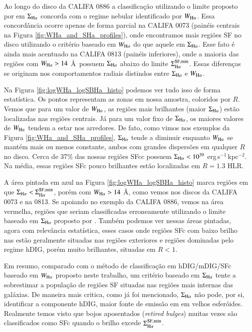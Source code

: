 Ao longo do disco da CALIFA 0886 a classificação utilizando o limite proposto por \citet{Zhang.etal.2017a} em $\Sigma_{\Ha}$ concorda com o regime nebular identificado por $W_{\Ha}$. Essa concordância ocorre apenas de forma parcial na CALIFA 0073 (painéis centrais na Figura \ref{fig:WHa_and_SHa_profiles}), onde encontramos mais regiões SF no disco utilizando o critério baseado em $W_{\Ha}$ do que aquele em $\Sigma_{\Ha}$. Esse fato é ainda mais acentuado na CALIFA 0813 (painéis inferiores), onde a maioria das regiões com $W_{\Ha} > 14$ \AA\ possuem $\Sigma_{\Ha}$ abaixo do limite $\Sigma^{\rm SF,min}_{\Ha}$. Essas diferenças se originam nos comportamentos radiais distindos entre $\Sigma_{\Ha}$ e $W_{\Ha}$.

Na Figura \ref{fig:logWHa_logSBHa_histo} podemos ver tudo isso de forma estatística. Os pontos representam as zonas em nossa amostra, coloridos por $R$. Vemos que para um valor de $W_{\Ha}$, as regiões mais brilhantes (maior $\Sigma_{\Ha}$) estão localizadas nas regiões centrais. Já para um valor fixo de $\Sigma_{\Ha}$, os maiores valores de $W_{\Ha}$ tendem a estar nos arredores. De fato, como vimos nos exemplos da Figura \ref{fig:WHa_and_SHa_profiles}, $\Sigma_{\Ha}$ tende a diminuir enquanto $W_{\Ha}$ se mantém mais ou menos constante, ambos com grandes dispersões em qualquer $R$ no disco. Cerca de 37\% das nossas regiões SFcc possuem $\Sigma_{\Ha} < 10^{39}$ erg$\,$s$^{-1}\,$kpc$^{-2}$. Na média, essas regiões SFc pouco brilhantes estão localizadas em $R = 1.3$ HLR.

A área pintada em azul na Figura \ref{fig:logWHa_logSBHa_histo} marca regiões em que $\Sigma_{\Ha} < \Sigma^{\rm SF,min}_{\Ha}$, porém com $W_{\Ha} > 14$ \AA, como vemos nos discos da CALIFA 0073 e na 0813. Se apoiando no exemplo da CALIFA 0886, vemos na área vermelha, regiões que seriam classificadas erroneamente utilizando o limite baseado em $\Sigma_{\Ha}$ proposto por \citet{Zhang.etal.2017a}. Também podemos ver nessas áreas pintadas, agora com relevância estatística, esses casos onde regiões SFc com baixo brilho nas estão geralmente situadas nas regiões exteriores e regiões dominadas pelo regime hDIG, porém muito brilhantes, situadas em $R < 1$.

Em resumo, comparado com o método de classificação em hDIG/mDIG/SFc baseado em $W_{\Ha}$ proposto neste trabalho, um critério baseado em $\Sigma_{\Ha}$ tente a sobrestimar a população de regiões SF situadas nas regiões mais internas das galáxias. De maneira mais critica, como já foi mencionado, $\Sigma_{\Ha}$ não pode, por si, identificar a componente hDIG, maior fonte de emissão em \Ha em velhos esferóides. Realmente temos visto que bojos aposentados ({\em retired bulges}) muitas vezes são classificados como SFc quando o brilho excede $\Sigma^{\rm SF,min}_{\Ha}$.

